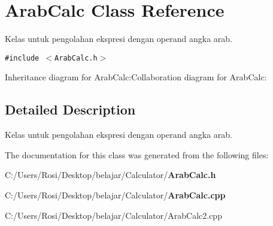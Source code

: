 \section{Arab\-Calc Class Reference}
\label{class_arab_calc}
Kelas untuk pengolahan ekspresi dengan operand angka arab.  


{\tt \#include $<$Arab\-Calc.h$>$}

Inheritance diagram for Arab\-Calc:Collaboration diagram for Arab\-Calc:

\subsection{Detailed Description}
Kelas untuk pengolahan ekspresi dengan operand angka arab. 



The documentation for this class was generated from the following files:\begin{CompactItemize}
\item 
C:/Users/Rosi/Desktop/belajar/Calculator/{\bf Arab\-Calc.h}\item 
C:/Users/Rosi/Desktop/belajar/Calculator/{\bf Arab\-Calc.cpp}\item 
C:/Users/Rosi/Desktop/belajar/Calculator/Arab\-Calc2.cpp\end{CompactItemize}
